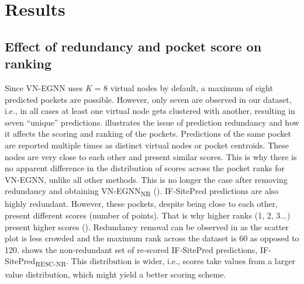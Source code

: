 \section{Results}

\subsection{Effect of redundancy and pocket score on ranking}

Since VN-EGNN uses \textit{K} = 8 virtual nodes by default, a maximum of eight predicted pockets are possible. However, only seven are observed in our dataset, i.e., in all cases at least one virtual node gets clustered with another, resulting in seven ``unique'' predictions.  illustrates the issue of prediction redundancy and how it affects the scoring and ranking of the pockets. Predictions of the same pocket are reported multiple times as distinct virtual nodes or pocket centroids. These nodes are very close to each other and present similar scores. This is why there is no apparent difference in the distribution of scores across the pocket ranks for VN-EGNN, unlike all other methods. This is no longer the case after removing redundancy and obtaining VN-EGNN\textsubscript{NR} (). IF-SitePred predictions are also highly redundant. However, these pockets, despite being close to each other, present different scores (number of points). That is why higher ranks (1, 2, 3...) present higher scores (). Redundancy removal can be observed in  as the scatter plot is less crowded and the maximum rank across the dataset is 60 as opposed to 120.  shows the non-redundant set of re-scored IF-SitePred predictions, IF-SitePred\textsubscript{RESC-NR}. This distribution is wider, i.e., scores take values from a larger value distribution, which might yield a better scoring scheme.

